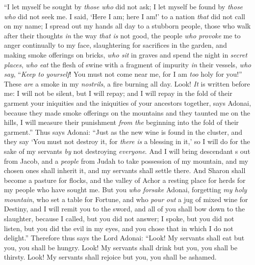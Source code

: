\begin{biblechapter} %
 “I let myself be sought by \textit{those who} did not ask; 
I let myself be found by \textit{those who} did not seek me. 
I said, ‘Here I am; here I am!’ to a nation \textit{that} did not call on my name;
\verse I spread out my hands all day to a stubborn people, 
those who walk after their thoughts \textit{in} the way \textit{that is} not good,
\verse the people \textit{who provoke} me to anger continually to my face, 
slaughtering for sacrifices in the garden, 
and making smoke offerings on bricks,
\verse \textit{who sit} in graves 
and spend the night in \textit{secret places}, 
\textit{who eat} the flesh of swine 
with a fragment of impurity \textit{in} their vessels,
\verse \textit{who say}, “\textit{Keep to yourself}! 
You must not come near me, for I am \textit{too} holy for you!” 
These \textit{are} a smoke in my \textit{nostrils}, 
a fire burning all day.
\verse Look! \textit{It} is written before me: I will not be silent, but I will repay; 
and I will repay in the fold of their garment
\verse your iniquities and the iniquities of your ancestors together, says Adonai, 
because they made smoke offerings on the mountains 
and they taunted me on the hills, 
I will measure their punishment \textit{from the} beginning into the fold of their garment.”
\verse Thus says Adonai: “Just as the new wine is found in the cluster, and they say ‘You must not destroy it, for \textit{there is} a blessing in it,’ so I will do for the sake of my servants \textit{by} not destroying \textit{everyone}.
\verse And I will bring descendant s out from Jacob, 
and a \textit{people} from Judah to take possession of my mountain, 
and my chosen ones shall inherit it, 
and my servants shall settle there.
\verse And Sharon shall become a pasture for flocks, 
and the valley of Achor a resting place for herds 
for my people who have sought me.
\verse But you \textit{who forsake} Adonai, 
forgetting \textit{my holy mountain}, 
who set a table for Fortune, 
and who \textit{pour out} a jug of mixed wine for Destiny,
\verse and I will remit you to the sword, 
and all of you shall bow down to the slaughter, 
because I called, but you did not answer; 
I spoke, but you did not listen, 
but you did the evil in my eyes, 
and you chose that in which I do not delight.”
\verse Therefore thus says the Lord Adonai:
\verse “Look! My servants shall eat but you, you shall be hungry. 
Look! My servants shall drink but you, you shall be thirsty. 
Look! My servants shall rejoice but you, you shall be ashamed.

\end{biblechapter}
